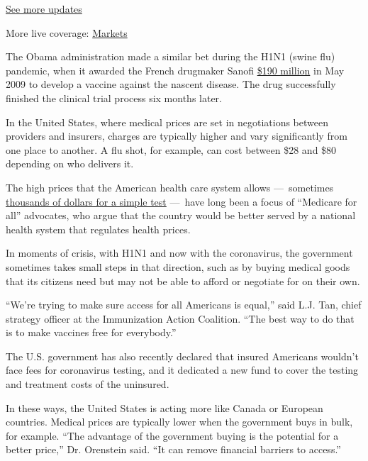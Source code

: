 \href{https://www.nytimes3xbfgragh.onion/2020/08/01/world/coronavirus-covid-19.html?action=click\&pgtype=Article\&state=default\&region=MAIN_CONTENT_1\&context=storylines_live_updates}{See
more updates}

More live coverage:
\href{https://www.nytimes3xbfgragh.onion/live/2020/07/31/business/stock-market-today-coronavirus?action=click\&pgtype=Article\&state=default\&region=MAIN_CONTENT_1\&context=storylines_live_updates}{Markets}

The Obama administration made a similar bet during the H1N1 (swine flu)
pandemic, when it awarded the French drugmaker Sanofi
\href{http://www.news.sanofi.us/press-releases?item=137044}{\$190
million} in May 2009 to develop a vaccine against the nascent disease.
The drug successfully finished the clinical trial process six months
later.

In the United States, where medical prices are set in negotiations
between providers and insurers, charges are typically higher and vary
significantly from one place to another. A flu shot, for example, can
cost between \$28 and \$80 depending on who delivers it.

The high prices that the American health care system allows
---~sometimes
\href{https://www.nytimes3xbfgragh.onion/2020/06/29/upshot/coronavirus-tests-unpredictable-prices.html}{thousands
of dollars for a simple test} ---~have long been a focus of ``Medicare
for all'' advocates, who argue that the country would be better served
by a national health system that regulates health prices.

In moments of crisis, with H1N1 and now with the coronavirus, the
government sometimes takes small steps in that direction, such as by
buying medical goods that its citizens need but may not be able to
afford or negotiate for on their own.

``We're trying to make sure access for all Americans is equal,'' said
L.J. Tan, chief strategy officer at the Immunization Action Coalition.
``The best way to do that is to make vaccines free for everybody.''

The U.S. government has also recently declared that insured Americans
wouldn't face fees for coronavirus testing, and it dedicated a new fund
to cover the testing and treatment costs of the uninsured.

In these ways, the United States is acting more like Canada or European
countries. Medical prices are typically lower when the government buys
in bulk, for example. ``The advantage of the government buying is the
potential for a better price,'' Dr. Orenstein said. ``It can remove
financial barriers to access.''

